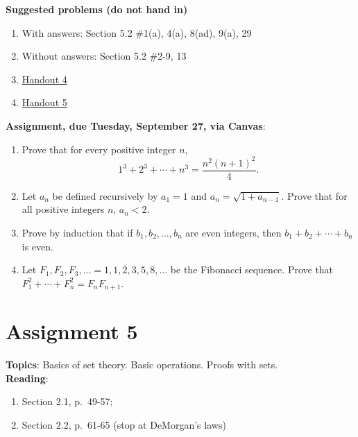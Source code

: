 \documentclass[12pt]{article}
\begin{document}
\noindent \textbf{Suggested problems (do not hand in)}

\begin{enumerate}
\item With answers: Section 5.2 \#1(a), 4(a), 8(ad), 9(a), 29
\item Without answers: Section 5.2 \#2-9, 13
\item \href{https://www.math.emory.edu/~dzb/teaching/250Fall2021/handouts/250-H04-induction-warmup.pdf}{Handout 4}
\item \href{https://www.math.emory.edu/~dzb/teaching/250Fall2021/handouts/250-H05-induction-problems.pdf}{Handout 5}
\end{enumerate}

\noindent \textbf{Assignment, due Tuesday, September 27, via Canvas}:
\begin{enumerate}
\item Prove that for every positive integer $n$,
 $$1^3 + 2^3 + \cdots +n^3 = \frac{n^2(n+1)^2}{4}.$$ 
\item Let $a_n$ be defined recursively by $a_1 = 1$ and $a_n = \sqrt{1 + a_{n-1}}$. Prove that for all positive integers $n$, $a_n < 2$.
\item Prove by induction that if $b_1, b_2, \ldots , b_n$ are even integers, then $b_1 + b_2 + \cdots + b_n$ is even.
 \item Let $F_1, F_2, F_3, \ldots = 1,1,2,3,5,8,\ldots$ be the Fibonacci sequence. Prove that $F_1^2 + \cdots + F_n^2 = F_nF_{n+1}$.
 \end{enumerate}
 

\newpage
\section[5 (due October 4): Basics of set theory. Basic operations. Proofs with sets.]{Assignment 5}

\textbf{Topics}: Basics of set theory. Basic operations. Proofs with sets.
\\

\noindent \textbf{Reading}:
\begin{enumerate}
\item Section 2.1, p.~49-57; 
\item Section 2.2, p.~61-65 (stop at DeMorgan's laws)
\end{enumerate}
\end{document}

